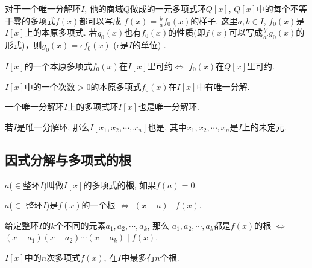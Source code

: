 \begin{Lemma}
对于一个唯一分解环$I$, 他的商域$Q$做成的一元多项式环$Q[x]$, 
$Q[x]$中的每个不等于零的多项式$f(x)$都可以写成
$\displaystyle f(x) = \frac{b}{a} f_0(x)$的样子.
这里$a, b \in I$, $f_0(x)$是$I[x]$上的本原多项式.
若$g_0(x)$也有$f_0(x)$的性质(即$f(x)$可以写成$\displaystyle \frac{b'}{a'} g_0(x)$的形式)，则$g_0(x) = \epsilon f_0(x)$ ($\epsilon$是$I$的单位)
.\end{Lemma}

\begin{Lemma}
$I[x]$的一个本原多项式$f_0(x)$在$I[x]$里可约$\Leftrightarrow$ $f_0(x)$在$Q[x]$里可约.
\end{Lemma}

\begin{Lemma}
$I[x]$中的一个次数$>0$的本原多项式$f_0(x)$在$I[x]$中有唯一分解.
\end{Lemma}

\begin{Theorem}
一个唯一分解环$I$上的多项式环$I[x]$也是唯一分解环.
\end{Theorem}

\begin{Theorem}
若$I$是唯一分解环, 那么$I[x_1, x_2, \cdots, x_n]$也是, 其中$x_1, x_2, \cdots, x_n$是$I$上的未定元.
\end{Theorem}

\subsection{因式分解与多项式的根}

\begin{Definition}
$a $\;($\in $整环$I$)叫做$I[x]$的多项式的\textbf{根}, 如果$f(a) = \mathfrak{0}$.
\end{Definition}

\begin{Theorem}
$a $\;($\in$ 整环$I$)是$f(x)$的一个根 $\Leftrightarrow$ $(x - a) \mid f(x)$.
\end{Theorem}

\begin{Theorem}
给定整环$I$的$k$个不同的元素$a_1, a_2, \cdots, a_k$, 那么
$a_1, a_2, \cdots, a_k$都是$f(x)$的根 $\Leftrightarrow$ 
$(x - a_1)(x - a_2)\cdots(x-a_k) \mid f(x)$.
\end{Theorem}

\begin{Corollary}
$I[x]$中的$n$次多项式$f(x)$, 在$I$中最多有$n$个根.
\end{Corollary}

